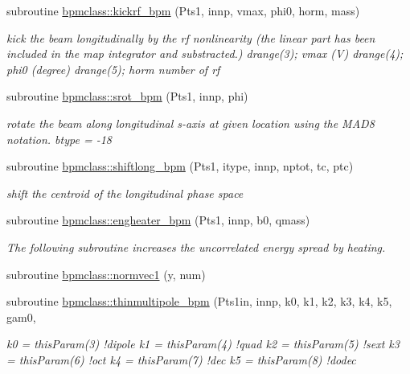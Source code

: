 \begin{DoxyCompactItemize}
subroutine \mbox{\hyperlink{namespacebpmclass_aee456e0f63daad3cb6eaba1bc99c948f}{bpmclass\+::kickrf\+\_\+bpm}} (Pts1, innp, vmax, phi0, horm, mass)
\begin{DoxyCompactList}\small\item\em kick the beam longitudinally by the rf nonlinearity (the linear part has been included in the map integrator and substracted.) drange(3); vmax (V) drange(4); phi0 (degree) drange(5); horm number of rf \end{DoxyCompactList}\item 
subroutine \mbox{\hyperlink{namespacebpmclass_ac8a2c78d2492dbd541f495bb0fd4840a}{bpmclass\+::srot\+\_\+bpm}} (Pts1, innp, phi)
\begin{DoxyCompactList}\small\item\em rotate the beam along longitudinal s-\/axis at given location using the M\+A\+D8 notation. btype = -\/18 \end{DoxyCompactList}\item 
subroutine \mbox{\hyperlink{namespacebpmclass_a3103b28e39ab8412e237df545aca9a71}{bpmclass\+::shiftlong\+\_\+bpm}} (Pts1, itype, innp, nptot, tc, ptc)
\begin{DoxyCompactList}\small\item\em shift the centroid of the longitudinal phase space \end{DoxyCompactList}\item 
subroutine \mbox{\hyperlink{namespacebpmclass_a8dac48fd52502e9f007f96a30003e1c8}{bpmclass\+::engheater\+\_\+bpm}} (Pts1, innp, b0, qmass)
\begin{DoxyCompactList}\small\item\em The following subroutine increases the uncorrelated energy spread by heating. \end{DoxyCompactList}\item 
subroutine \mbox{\hyperlink{namespacebpmclass_ab4b58d389b1b0c7169a20e75f2f32389}{bpmclass\+::normvec1}} (y, num)
\item 
subroutine \mbox{\hyperlink{namespacebpmclass_a53e45bf561ab6326ac3af0941f0a9ab4}{bpmclass\+::thinmultipole\+\_\+bpm}} (Pts1in, innp, k0, k1, k2, k3, k4, k5, gam0,
\begin{DoxyCompactList}\small\item\em k0 = thisParam(3) !dipole k1 = thisParam(4) !quad k2 = thisParam(5) !sext k3 = thisParam(6) !oct k4 = thisParam(7) !dec k5 = thisParam(8) !dodec \end{DoxyCompactList}\end{DoxyCompactItemize}
